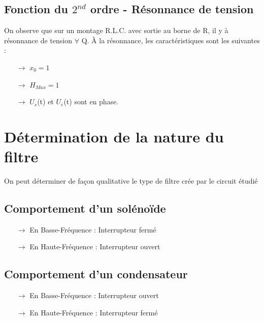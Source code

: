 \subsection{Fonction du $2^{nd}$ ordre - Résonnance de tension}
On observe que sur un montage R.L.C. avec sortie au borne de R, il y à résonnance de tension $\forall$ Q.
À la résonnance, les caractéristiques sont les suivantes :
\begin{itemize}
 \item[$\rightarrow$]$x_0 = 1$
 \item[$\rightarrow$]$H_{Max} = 1$
 \item[$\rightarrow$]$U_s$(t) et $U_e$(t) sont en phase.
\end{itemize}
\section{Détermination de la nature du filtre}
On peut déterminer de façon qualitative le type de filtre crée par le circuit étudié
\subsection{Comportement d'un solénoïde}
\begin{itemize}
 \item[$\rightarrow$] En Basse-Fréquence : Interrupteur fermé
 \item[$\rightarrow$] En Haute-Fréquence : Interrupteur ouvert
\end{itemize}
\subsection{Comportement d'un condensateur}
\begin{itemize}
 \item[$\rightarrow$] En Basse-Fréquence : Interrupteur ouvert
 \item[$\rightarrow$] En Haute-Fréquence : Interrupteur fermé
\end{itemize}
